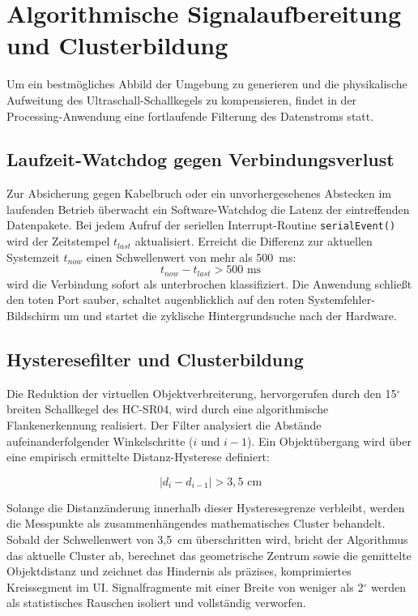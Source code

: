 \section{Algorithmische Signalaufbereitung und Clusterbildung}
\label{sec:Signalaufbereitung_Filter}

Um ein bestmögliches Abbild der Umgebung zu generieren und die physikalische Aufweitung des Ultraschall-Schallkegels zu kompensieren, findet in der Processing-Anwendung eine fortlaufende Filterung des Datenstroms statt.

\subsection{Laufzeit-Watchdog gegen Verbindungsverlust}
Zur Absicherung gegen Kabelbruch oder ein unvorhergesehenes Abstecken im laufenden Betrieb überwacht ein Software-Watchdog die Latenz der eintreffenden Datenpakete. Bei jedem Aufruf der seriellen Interrupt-Routine \texttt{serialEvent()} wird der Zeitstempel $t_{last}$ aktualisiert. Erreicht die Differenz zur aktuellen Systemzeit $t_{now}$ einen Schwellenwert von mehr als 500~ms:
\begin{equation}
	t_{now} - t_{last} > 500\text{ ms}
\end{equation}
wird die Verbindung sofort als unterbrochen klassifiziert. Die Anwendung schlie\ss t den toten Port sauber, schaltet augenblicklich auf den roten Systemfehler-Bildschirm um und startet die zyklische Hintergrundsuche nach der Hardware.

\subsection{Hysteresefilter und Clusterbildung}
Die Reduktion der virtuellen Objektverbreiterung, hervorgerufen durch den 15$^\circ$ breiten Schallkegel des HC-SR04, wird durch eine algorithmische Flankenerkennung realisiert. Der Filter analysiert die Abstände aufeinanderfolgender Winkelschritte ($i$ und $i-1$). Ein Objektübergang wird über eine empirisch ermittelte Distanz-Hysterese definiert:

\begin{equation}
	|d_i - d_{i-1}| > 3{,}5\text{ cm}
\end{equation}

Solange die Distanzänderung innerhalb dieser Hysteresegrenze verbleibt, werden die Messpunkte als zusammenhängendes mathematisches Cluster behandelt. Sobald der Schwellenwert von 3,5~cm überschritten wird, bricht der Algorithmus das aktuelle Cluster ab, berechnet das geometrische Zentrum sowie die gemittelte Objektdistanz und zeichnet das Hindernis als präzises, komprimiertes Kreissegment im UI. Signalfragmente mit einer Breite von weniger als 2$^\circ$ werden als statistisches Rauschen isoliert und vollständig verworfen.

